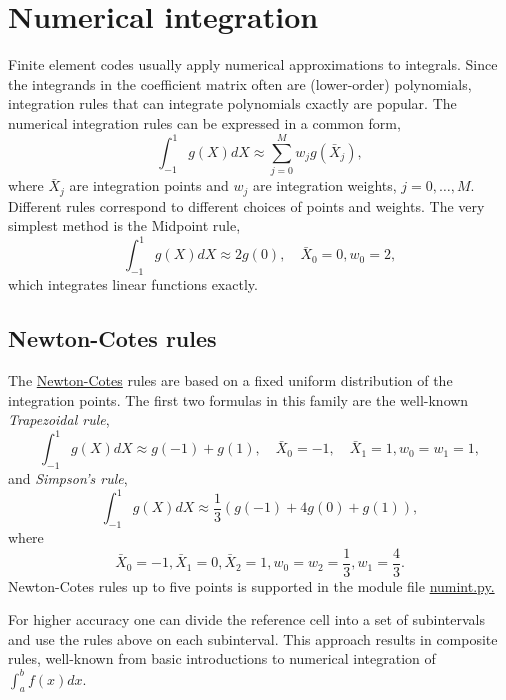 \documentclass[../main.tex]{subfiles}
\begin{document}
	
		\chapter{Numerical integration}
	\label{chap:chap_7}
	\noindent Finite element codes usually apply numerical approximations to integrals. Since the integrands in the coefficient matrix often are (lower-order) polynomials, integration rules that can integrate polynomials cxactly are popular.
	The numerical integration rules can be expressed in a common form,
	\begin{equation}\label{eqa99}
		\int_{-1}^{1} g(X) d X \approx \sum_{j=0}^{M} w_{j} g\left(\bar{X}_{j}\right),
	\end{equation}	
	where $\bar{X}_{j}$ are integration points and $w_{j}$ are integration weights, $j=0, \ldots, M$. Different rules correspond to different choices of points and weights.
	The very simplest method is the Midpoint rule,
	\begin{equation}\label{eqa100}
		\int_{-1}^{1} g(X) d X \approx 2 g(0), \quad \bar{X}_{0}=0, w_{0}=2,
	\end{equation}	
	which integrates linear functions exactly.
	\section[Newton-Cotes rules]{Newton-Cotes rules}
	\label{sec:sec_7_1}
	\noindent The \href{https://en.wikipedia.org/wiki/Newton%E2%80%93Cotes_formulas}{Newton-Cotes} rules are based on a fixed uniform distribution of the integration points. The first two formulas in this family are the well-known \textit{Trapezoidal rule},
	\begin{equation}\label{eqa101}
		\int_{-1}^{1} g(X) d X \approx g(-1)+g(1), \quad \bar{X}_{0}=-1, \quad \bar{X}_{1}=1, w_{0}=w_{1}=1,
	\end{equation}
	and \textit{Simpson's rule},
	\begin{equation}\label{eqa102}
		\int_{-1}^{1} g(X) d X \approx \frac{1}{3}(g(-1)+4 g(0)+g(1)),
	\end{equation}
	where
	\begin{equation}\label{eqa103}
		\bar{X}_{0}=-1, \bar{X}_{1}=0, \bar{X}_{2}=1, w_{0}=w_{2}=\frac{1}{3}, w_{1}=\frac{4}{3}.
	\end{equation}
	Newton-Cotes rules up to five points is supported in the module file \href{https://github.com/hplgit/INF5620/blob/master/src/fem/numint.py}{numint.py.}
	
	For higher accuracy one can divide the reference cell into a set of subintervals and use the rules above on each subinterval. This approach results in composite rules, well-known from basic introductions to numerical integration of $\int_{a}^{b} f(x) d x$.
	\bigbreak
\end{document}
